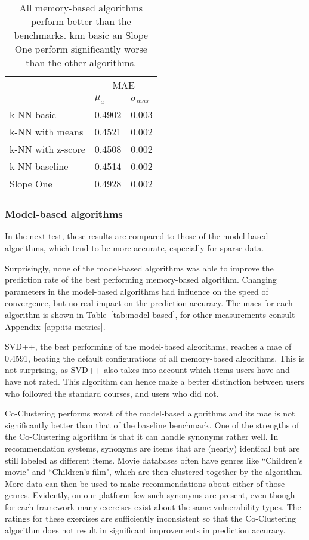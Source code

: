 \begin{table}
    \centering
    \caption[Prediction performance of memory-based algorithms]{All memory-based algorithms perform better than the benchmarks. \gls{knn} basic an Slope One perform significantly worse than the other algorithms.}
    \label{tab:memory-based}
    \small
    \begin{tabular}{l ll}
                 & \multicolumn{2}{c}{MAE}\\
    \cline{2-3} 
    & $\mu_a$ & $\sigma_{max}$\\
    \hline
k-NN basic        & 0.4902 & 0.003 \\ 
k-NN with means   & 0.4521 & 0.002 \\ 
k-NN with z-score & 0.4508 & 0.002 \\ 
k-NN baseline     & 0.4514 & 0.002 \\ 
Slope One         & 0.4928 & 0.002 \\
    \end{tabular}
\end{table}

\subsubsection{Model-based algorithms}
In the next test, these results are compared to those of the model-based algorithms, which tend to be more accurate, especially for sparse data.

Surprisingly, none of the model-based algorithms was able to improve the prediction rate of the best performing memory-based algorithm.
Changing parameters in the model-based algorithms had influence on the speed of convergence, but no real impact on the prediction accuracy.
The \glspl{mae} for each algorithm is shown in Table~\ref{tab:model-based}, for other measurements consult Appendix~\ref{app:its-metrics}.

SVD++, the best performing of the model-based algorithms, reaches a \gls{mae} of 0.4591, beating the default configurations of all memory-based algorithms.
This is not surprising, as SVD++ also takes into account which items users have and have not rated.
This algorithm can hence make a better distinction between users who followed the standard courses, and users who did not.

Co-Clustering performs worst of the model-based algorithms and its \gls{mae} is not significantly better than that of the baseline benchmark.
One of the strengths of the Co-Clustering algorithm is that it can handle synonyms rather well.
In recommendation systems, synonyms are items that are (nearly) identical but are still labeled as different items.
Movie databases often have genres like ``Children's movie" and ``Children's film", which are then clustered together by the algorithm.
More data can then be used to make recommendations about either of those genres.
Evidently, on our platform few such synonyms are present, even though for each framework many exercises exist about the same vulnerability types.
The ratings for these exercises are sufficiently inconsistent so that the Co-Clustering algorithm does not result in significant improvements in prediction accuracy.

